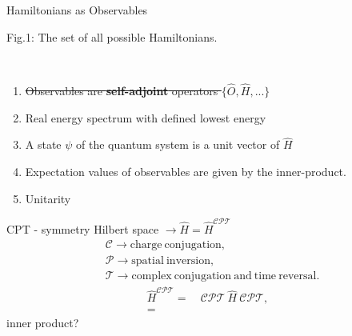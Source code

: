 \documentclass[10pt]{beamer}
\begin{document}
\begin{frame}{Hamiltonians as Observables}
    \\
    \hspace{1em}
    \begin{tiny}
        Fig.1: The set of all possible Hamiltonians.
    \end{tiny}
    \\
    \begin{enumerate}
        \item \textcolor{myNewColorA}{\st{Observables are \textbf{self-adjoint} operators $\{\hat{O}, \hat{H}, ...\}$}}
        \item \textcolor{myNewColorC}{Real energy spectrum with defined lowest energy}
        \item \textcolor{myNewColorC}{A state $\psi$ of the quantum system is a unit vector of $\hat{H}$}
        \item \textcolor{myNewColorC}{Expectation values of observables are given by the inner-product.}
        \item \textcolor{myNewColorC}{Unitarity}
    \end{enumerate}
\end{frame}

\begin{frame}{CPT - symmetry}
\vspace{-2cm}
Hilbert space $\rightarrow \hat{H} = \hat{H}^{\mathcal{CPT}}$ \\
\begin{align*}
    & \mathcal{C} \rightarrow \mathrm{charge\:conjugation},\\
    & \mathcal{P} \rightarrow \mathrm{spatial\:inversion},\\
    & \mathcal{T} \rightarrow \mathrm{complex\:conjugation\:and\:time\:reversal}.
\end{align*}
\begin{align*}
    \hat{H}^{\mathcal{CPT}} = &\:\mathcal{CPT}\:\hat{H}\:\mathcal{CPT},\\
                            = & 
\end{align*}
inner product?
\end{frame}
\end{document}
